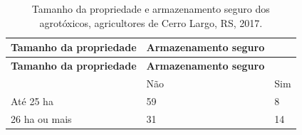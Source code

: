 \documentclass[12pt,brazil,]{book}
\begin{document}
\begin{longtable}[]{@{}lll@{}}
\caption{\label{tab:tamprop}Tamanho da propriedade e armazenamento seguro
dos agrotóxicos, agricultores de Cerro Largo, RS, 2017.}\tabularnewline
\toprule
\begin{minipage}[b]{0.35\columnwidth}\raggedright
\textbf{Tamanho da propriedade}\strut
\end{minipage} & \begin{minipage}[b]{0.32\columnwidth}\raggedright
\textbf{Armazenamento seguro}\strut
\end{minipage} & \begin{minipage}[b]{0.15\columnwidth}\raggedright
\strut
\end{minipage}\tabularnewline
\midrule
\endfirsthead
\toprule
\begin{minipage}[b]{0.35\columnwidth}\raggedright
\textbf{Tamanho da propriedade}\strut
\end{minipage} & \begin{minipage}[b]{0.32\columnwidth}\raggedright
\textbf{Armazenamento seguro}\strut
\end{minipage} & \begin{minipage}[b]{0.15\columnwidth}\raggedright
\strut
\end{minipage}\tabularnewline
\midrule
\endhead
\begin{minipage}[t]{0.35\columnwidth}\raggedright
\strut
\end{minipage} & \begin{minipage}[t]{0.32\columnwidth}\raggedright
Não\strut
\end{minipage} & \begin{minipage}[t]{0.15\columnwidth}\raggedright
Sim\strut
\end{minipage}\tabularnewline
\begin{minipage}[t]{0.35\columnwidth}\raggedright
Até 25 ha\strut
\end{minipage} & \begin{minipage}[t]{0.32\columnwidth}\raggedright
59\strut
\end{minipage} & \begin{minipage}[t]{0.15\columnwidth}\raggedright
8\strut
\end{minipage}\tabularnewline
\begin{minipage}[t]{0.35\columnwidth}\raggedright
26 ha ou mais\strut
\end{minipage} & \begin{minipage}[t]{0.32\columnwidth}\raggedright
31\strut
\end{minipage} & \begin{minipage}[t]{0.15\columnwidth}\raggedright
14\strut
\end{minipage}\tabularnewline
\bottomrule
\end{longtable}
\end{document}
